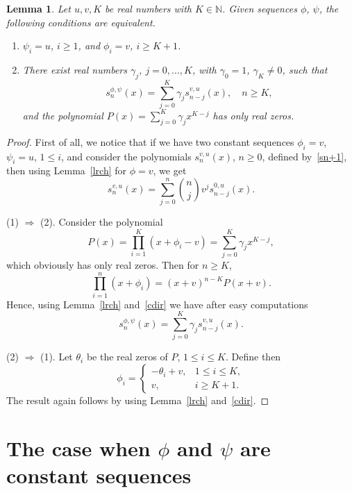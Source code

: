 \documentclass[10pt, a4paper, leqno]{amsart}
\numberwithin{equation}{section}
\theoremstyle{plain}
\newtheorem{Lem}[Theo]{Lemma}
\theoremstyle{remark}
\newcommand{\NN}{\mathbb{N}}
\newcommand{\scvu}{s^{v,u}}
\begin{document}
\begin{Lem}
\label{eqp}
Let $u,v, K$ be real numbers with $K\in \NN$.
 Given sequences $\phi$, $\psi$, the following conditions are equivalent.
\begin{enumerate}
\item $\psi_i=u$, $i\ge 1$, and $\phi_i=v$, $i\ge K+1$.
\item There exist real numbers $\gamma_j$, $j=0,\dots, K$, with $\gamma_0=1$, $\gamma_K \ne 0$, such that
\[
  s_n^{\phi,\psi}(x) =\sum_{j=0}^K\gamma_j\scvu_{n-j}(x),\quad n\ge K,
\]
and the polynomial $P(x)=\sum_{j=0}^K\gamma_jx^{K-j}$ has only real zeros.
\end{enumerate}
\end{Lem}

\begin{proof}
First of all, we notice that if we have two constant sequences $\phi_i=v$, $\psi_i=u$, $1\le i$, and consider the polynomials
$\scvu_n(x)$, $n\ge0$, defined by~\eqref{sn+1}, then
using Lemma~\ref{lrch} for $\phi=v$, we get
\begin{equation}
\label{cdir}
  s_n^{v,u}(x) = \sum_{j=0}^n \binom{n}{j} v^js_{n-j}^{0,u}(x).
\end{equation}

(1) $\Rightarrow$ (2).
Consider the polynomial
\[
  P(x) = \prod_{i=1}^K(x+\phi_i-v) = \sum_{j=0}^K \gamma_jx^{K-j},
\]
which obviously has only real zeros.
Then for $n\ge K$,
\[
  \prod_{i=1}^n (x+\phi_i) = (x+v)^{n-K}P(x+v).
\]
Hence, using Lemma~\ref{lrch} and~\eqref{cdir} we have after easy computations
\[
  s_n^{\phi,\psi}(x) = \sum_{j=0}^K\gamma_j\scvu_{n-j}(x).
\]

(2) $\Rightarrow$ (1).
Let $\theta_i$ be the real zeros of $P$, $1\le i\le K$. Define then
\begin{equation*}
  \phi_i = \begin{cases} -\theta_i+v,&1\le i\le K,\\ v,&i\ge K+1.\end{cases}
\end{equation*}
The result again follows by using Lemma~\ref{lrch} and~\eqref{cdir}.
\end{proof}

\section{The case when \texorpdfstring{$\phi$}{phi} and \texorpdfstring{$\psi$}{psi} are constant sequences}
\label{sec5}
\end{document}
